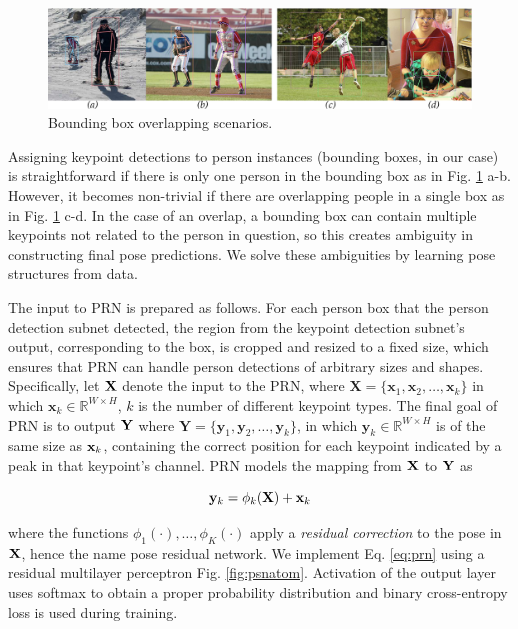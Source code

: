 \documentclass[runningheads]{llncs}
\begin{document}
\begin{figure}
\centering
\includegraphics[width=\textwidth]{Figures/overlap.pdf}
\caption{Bounding box overlapping scenarios.}
\label{fig:overlap}
\end{figure}


Assigning keypoint detections to person instances (bounding boxes, in our case) is straightforward if there is only one person in the bounding box as in Fig. \ref{fig:overlap} a-b. However, it becomes non-trivial if there are overlapping people in a single box as in Fig. \ref{fig:overlap} c-d. In the case of an overlap, a bounding box can contain multiple keypoints not related to the person in question, so this creates ambiguity in constructing final pose predictions. We solve these ambiguities by learning pose structures from data.


The input to PRN is prepared as follows. For each person box that the person detection subnet detected, the region from the keypoint detection subnet's output, corresponding to the box, is cropped and resized to a fixed size, which ensures that PRN can handle person detections of arbitrary sizes and shapes. Specifically, let $\bf X$ denote the input to the PRN, where $\mathbf{X} = \{\mathbf{x}_1, \mathbf{x}_2, \dots, \mathbf{x}_k\}$ in which $\mathbf{x}_k \in \mathbb{R}^{W \times H}$, $k$ is the number of different keypoint types. The final goal of PRN is to output $\bf Y$ where $\mathbf{Y} = \{\mathbf{y}_1, \mathbf{y}_2, \dots, \mathbf{y}_k\}$, in which $\mathbf{y}_k \in \mathbb{R}^{W \times H}$ is of the same size as ${\bf x}_k$, containing the correct position for each keypoint indicated by a peak in that keypoint’s channel. PRN models the mapping from $\bf X$ to $\bf Y$ as 


\begin{equation}
{\bf y}_k = \phi_k ( {\bf X}) + {\bf x}_k 
\label{eq:prn}
\end{equation}


\noindent where the functions $\phi_1(\cdot), \dots , \phi_K(\cdot)$ apply a \textit{residual correction} to the pose in $\bf X$, hence the name pose residual network. We implement Eq. \ref{eq:prn} using a residual multilayer perceptron Fig. \ref{fig:psnatom}. Activation of the output layer uses softmax to obtain a proper probability distribution and binary cross-entropy loss is used during training. 
\end{document}
